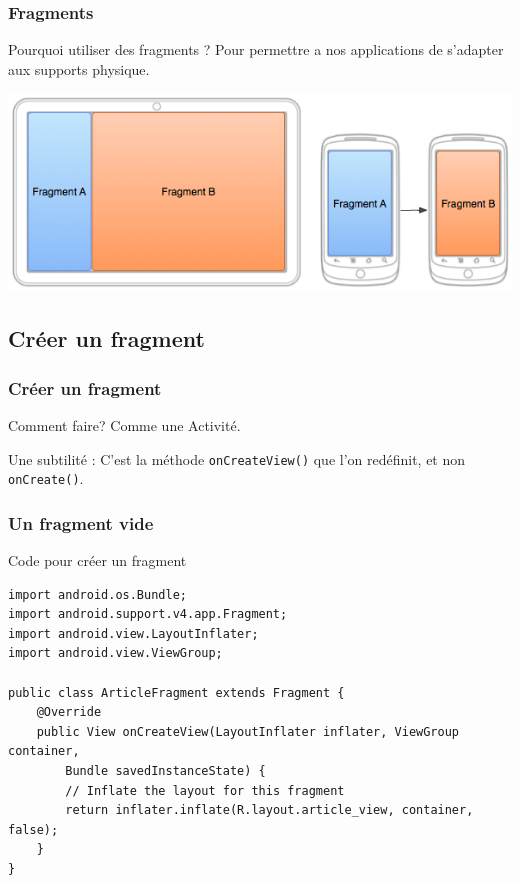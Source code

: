 \documentclass{beamer}
\begin{document}
\begin{frame}
\frametitle{Fragments}

\begin{block}{Pourquoi utiliser des fragments ?}
Pour permettre a nos applications de s'adapter aux supports physique.
\end{block}

\begin{center}
\includegraphics[scale=0.5]{fragments-screen-mock.png}
\end{center}
\end{frame}

\subsection{Créer un fragment}

\begin{frame}
\frametitle{Créer un fragment}
\begin{block}{Comment faire?}
Comme une Activité.
\end{block}

\begin{block}{Une subtilité :}
C'est la méthode \verb!onCreateView()! que l'on redéfinit, et non \verb!onCreate()!.
\end{block}
\end{frame}


\begin{frame}[fragile]
\frametitle{Un fragment vide}
\begin{block}{Code pour créer un fragment}
\lstset{language=java}
\begin{lstlisting}
import android.os.Bundle;
import android.support.v4.app.Fragment;
import android.view.LayoutInflater;
import android.view.ViewGroup;

public class ArticleFragment extends Fragment {
    @Override
    public View onCreateView(LayoutInflater inflater, ViewGroup container,
        Bundle savedInstanceState) {
        // Inflate the layout for this fragment
        return inflater.inflate(R.layout.article_view, container, false);
    }
}
\end{lstlisting}
\end{block}
\end{frame}
\end{document}
